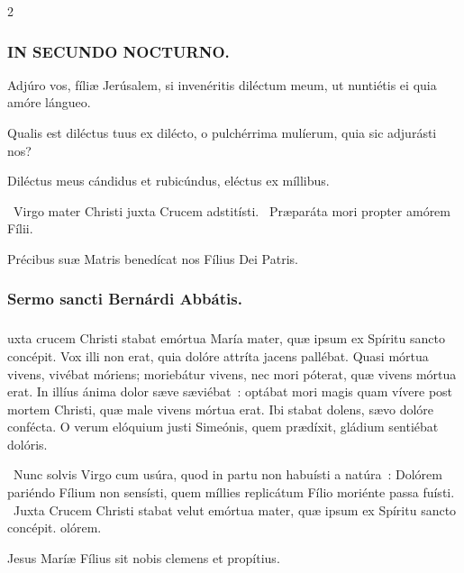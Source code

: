 \documentclass[9pt,twoside]{extarticle}
\begin{document}
\begin{multicols}{2}
{{\subsubsection*{\center \textsc{IN SECUNDO NOCTURNO.}}
\begin{tightlist}{}
\item {} Adjúro vos, fíliæ Jerúsalem, si invenéritis diléctum meum, ut nuntiétis ei quia amóre lángueo.
\item {} Qualis est diléctus tuus ex dilécto, o pulchérrima mulíerum, quia sic adjurásti nos?
\item {} Diléctus meus cándidus et rubicúndus, eléctus ex míllibus.
\item {}~Virgo mater Christi juxta Crucem adstitísti. ~Præparáta mori propter amórem Fílii.
\item {\small {} Précibus suæ Matris benedícat nos Fílius Dei Patris.}
\end{tightlist}

\subsubsection*{\center Sermo sancti Bernárdi Abbátis.}
\subsubsection*{\center {}}
uxta crucem Christi stabat emórtua María mater, quæ ipsum ex Spíritu sancto concépit. Vox illi non erat, quia dolóre attríta jacens pallébat. Quasi mórtua vivens, vivébat móriens; moriebátur vivens, nec mori póterat, quæ vivens mórtua erat. In illíus ánima dolor sæve sæviébat~: optábat mori magis quam vívere post mortem Christi, quæ male vivens mórtua erat. Ibi stabat dolens, sævo dolóre confécta. O verum elóquium justi Simeónis, quem prædíxit, gládium sentiébat dolóris.

\begin{tightlist}{}
\item {}~Nunc solvis Virgo cum usúra, quod in partu non habuísti a natúra~: \textred{*} Dolórem pariéndo Fílium non sensísti, quem míllies replicátum Fílio moriénte passa fuísti. ~Juxta Crucem Christi stabat velut emórtua mater, quæ ipsum ex Spíritu sancto concépit. olórem.
\item {\small {} Jesus Maríæ Fílius sit nobis clemens et propítius.}
\end{tightlist}

}}
\end{multicols}
\end{document}
